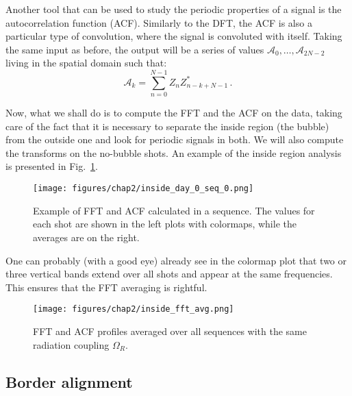 Another tool that can be used to study the periodic properties of a signal is the autocorrelation function (ACF). Similarly to the DFT, the ACF is also a particular type of convolution, where the signal is convoluted with itself. Taking the same input as before, the output will be a series of values $\mathcal{A}_0,\dots,\mathcal{A}_{2N-2}$ living in the spatial domain such that:
\begin{equation*}
    \mathcal{A}_k = \sum_{n=0}^{N-1} Z_n Z^*_{n-k+N-1}\, .
\end{equation*}

Now, what we shall do is to compute the FFT and the ACF on the data, taking care of the fact that it is necessary to separate the inside region (the bubble) from the outside one and look for periodic signals in both. We will also compute the transforms on the no-bubble shots. An example of the inside region analysis is presented in Fig.\ \ref{fig:inside_00}.
\begin{figure}[h!]
    \centering
    \texttt{[image: figures/chap2/inside\_day\_0\_seq\_0.png]}
    \caption{Example of FFT and ACF calculated in a sequence. The values for each shot are shown in the left plots with colormaps, while the averages are on the right.}
    \label{fig:inside_00}
\end{figure}
One can probably (with a good eye) already see in the colormap plot that two or three vertical bands extend over all shots and appear at the same frequencies. This ensures that the FFT averaging is rightful.
\begin{figure}[t!]
    \centering
    \texttt{[image: figures/chap2/inside\_fft\_avg.png]}
    \caption{FFT and ACF profiles averaged over all sequences with the same radiation coupling $\Omega_R$.}
    \label{fig:inside_avg}
\end{figure}

\subsection{Border alignment}
